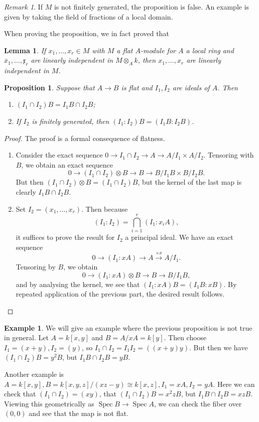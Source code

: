 \documentclass[leqno, openany]{memoir}
\newtheorem{prop}[thm]{Proposition}
\newtheorem{lem}[thm]{Lemma}
\theoremstyle{definition}
\newtheorem{exm}[thm]{Example}
\theoremstyle{remark}
\newtheorem{rmk}[thm]{Remark}
\theoremstyle{plain}
\theoremstyle{definition}
\theoremstyle{remark}
\newcommand{\mf}[1]{\mathfrak{#1}}
\newcommand{\ol}[1]{\overline{#1}}
\DeclareMathOperator{\Spec}{Spec}
\begin{document}
\begin{rmk}
    If $M$ is not finitely generated, the proposition is false. An example is given by taking the field of fractions of a local domain.
\end{rmk}

When proving the proposition, we in fact proved that
\begin{lem}
    If $x_1, \ldots, x_r \in M$ with $M$ a flat $A$-module for $A$ a local ring and $\ol{x}_1, \ldots, \mf{x}_r$ are linearly independent in $M \otimes_A k$, then $x_1, \ldots, x_r$ are linearly independent in $M$.
\end{lem}

\begin{prop}
    Suppose that $A \to B$ is flat and $I_1, I_2$ are ideals of $A$. Then
    \begin{enumerate}
        \item $(I_1 \cap I_2)B = I_1 B \cap I_2 B$;
        \item If $I_2$ is finitely generated, then $(I_1 : I_2)B = (I_1 B : I_2 B)$.
    \end{enumerate}
\end{prop}

\begin{proof}
    The proof is a formal consequence of flatness.
    \begin{enumerate}
        \item Consider the exact sequence $0 \to I_1 \cap I_2 \to A \to A/I_1 \times A/I_2$. Tensoring with $B$, we obtain an exact sequence
            \[ 0 \to (I_1 \cap I_2) \otimes B \to B \to B/I_1 B \times B/I_2 B. \]
            But then $(I_1 \cap I_2) \otimes B = (I_1 \cap I_2)B$, but the kernel of the last map is clearly $I_1 B \cap I_2 B$.
        \item Set $I_2 = (x_1, \ldots, x_r)$. Then because
            \[ (I_1 : I_2) = \bigcap_{i=1}^r (I_1 : x_i A), \]
            it suffices to prove the result for $I_2$ a principal ideal. We have an exact sequence
            \[ 0 \to (I_1 : x A) \to A \xrightarrow{\times x} A/I_1. \]
            Tensoring by $B$, we obtain
            \[ 0 \to (I_1 : x A) \otimes B \to B \to B/I_1 B, \]
            and by analysing the kernel, we see that $(I_1: xA) B = (I_1 B: x B)$. By repeated application of the previous part, the desired result follows. \qedhere
    \end{enumerate}
\end{proof}

\begin{exm}
    We will give an example where the previous proposition is not true in general. Let $A = k[x,y]$ and $B = A/xA = k[y]$. Then choose $I_1 = (x+y), I_2 = (y)$, so $I_1 \cap I_2 = I_1 I_2 = ( (x+y)y )$. But then we have $(I_1 \cap I_2) B = y^2 B$, but $I_1 B \cap I_2 B = yB$.

    Another example is $A = k[x,y], B = k[x,y,z]/(xz-y) \cong k[x,z], I_1 = xA, I_2 = yA$. Here we can check that $(I_1 \cap I_2) = (xy)$, that $(I_1 \cap I_2)B = x^2z B$, but $I_1 B \cap I_2 B = xz B$. Viewing this geometrically as $\Spec B \to \Spec A$, we can check the fiber over $(0,0)$ and see that the map is not flat.
\end{exm}
\end{document}
